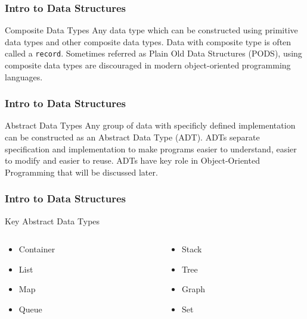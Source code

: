 \documentclass[10pt, compress]{beamer}
\begin{document}
\begin{frame}[fragile]
	\frametitle{Intro to Data Structures}
	\begin{block}{Composite Data Types}
		Any data type which can be constructed using primitive data types and other composite data types. Data with composite type is often called a \texttt{record}. Sometimes referred as Plain Old Data Structures (PODS), using composite data types are discouraged in modern object-oriented programming languages.
	\end{block}
\end{frame}

\begin{frame}[fragile]
	\frametitle{Intro to Data Structures}
	\begin{block}{Abstract Data Types}
		Any group of data with specificly defined implementation can be constructed as an Abstract Data Type (ADT). ADTs separate specification and implementation to make programs easier to understand, easier to modify and easier to reuse. ADTs have key role in Object-Oriented Programming that will be discussed later.
	\end{block}
\end{frame}

\begin{frame}[fragile]
	\frametitle{Intro to Data Structures}
	\begin{block}{Key Abstract Data Types}
		\begin{columns}
			\begin{column}{0.5\textwidth}
				\begin{itemize}
					\item[] Container
					\item[] List
					\item[] Map
					\item[] Queue
				\end{itemize}
			\end{column}
			\begin{column}{0.5\textwidth}
				\begin{itemize}
					\item[] Stack
					\item[] Tree
					\item[] Graph
					\item[] Set
				\end{itemize}
			\end{column}
		\end{columns}
	\end{block}
\end{frame}
\end{document}
